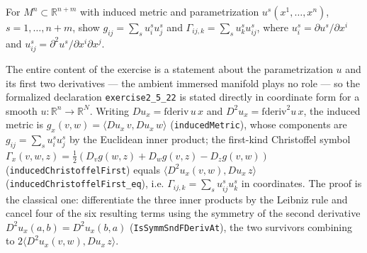 \begin{remark}
  \label{rem:pet-ch2-ex-22}
  \leanok
  For $M^n\subset\mathbb{R}^{n+m}$ with induced metric and parametrization
  $u^s(x^1,\dots,x^n)$, $s=1,\dots,n+m$, show
  $g_{ij}=\sum_su^s_iu^s_j$ and
  $\Gamma_{ij,k}=\sum_su^s_ku^s_{ij}$, where $u^s_i=\partial u^s/\partial x^i$
  and $u^s_{ij}=\partial^2u^s/\partial x^i\partial x^j$.

  The entire content of the exercise is a statement about the parametrization
  $u$ and its first two derivatives — the ambient immersed manifold plays no
  role — so the formalized declaration \texttt{exercise2\_5\_22} is stated
  directly in coordinate form for a smooth $u:\mathbb{R}^n\to\mathbb{R}^N$.
  Writing $Du_x=\mathrm{fderiv}\,u\,x$ and $D^2u_x=\mathrm{fderiv}^2u\,x$, the
  induced metric is $g_x(v,w)=\langle Du_x\,v,Du_x\,w\rangle$
  (\texttt{inducedMetric}), whose components are $g_{ij}=\sum_su^s_iu^s_j$ by
  the Euclidean inner product; the first-kind Christoffel symbol
  $\Gamma_x(v,w,z)=\tfrac12\!\left(D_v g(w,z)+D_w g(v,z)-D_z g(v,w)\right)$
  (\texttt{inducedChristoffelFirst}) equals $\langle D^2u_x(v,w),Du_x\,z\rangle$
  (\texttt{inducedChristoffelFirst\_eq}), i.e. $\Gamma_{ij,k}=\sum_su^s_{ij}u^s_k$
  in coordinates. The proof is the classical one: differentiate the three inner
  products by the Leibniz rule and cancel four of the six resulting terms using
  the symmetry of the second derivative $D^2u_x(a,b)=D^2u_x(b,a)$
  (\texttt{IsSymmSndFDerivAt}), the two survivors combining to
  $2\langle D^2u_x(v,w),Du_x\,z\rangle$.
\end{remark}

